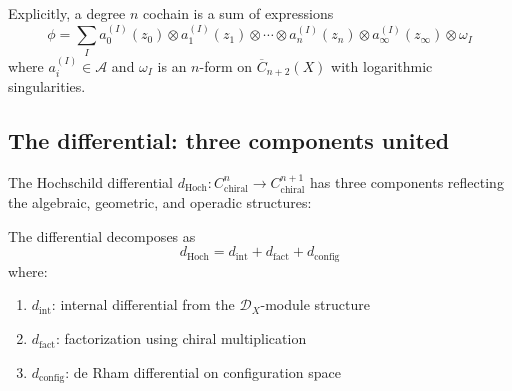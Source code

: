 Explicitly, a degree $n$ cochain is a sum of expressions
\[
\phi = \sum_I a_0^{(I)}(z_0) \otimes a_1^{(I)}(z_1) \otimes \cdots \otimes a_n^{(I)}(z_n) \otimes a_{\infty}^{(I)}(z_{\infty}) \otimes \omega_I
\]
where $a_i^{(I)} \in \mathcal{A}$ and $\omega_I$ is an $n$-form on $\overline{C}_{n+2}(X)$ with logarithmic singularities.

\subsection{The differential: three components united}

The Hochschild differential
$d_{\mathrm{Hoch}}: C^n_{\text{chiral}} \to C^{n+1}_{\text{chiral}}$
has three components reflecting the algebraic, geometric, and operadic
structures:

\begin{theorem}
\label{thm:chiral-hochschild-differential}
The differential decomposes as
\[
d_{\mathrm{Hoch}} = d_{\text{int}} + d_{\text{fact}} + d_{\text{config}}
\]
where:
\begin{enumerate}
\item $d_{\text{int}}$: internal differential from the $\mathcal{D}_X$-module structure
\item $d_{\text{fact}}$: factorization using chiral multiplication  
\item $d_{\text{config}}$: de Rham differential on configuration space
\end{enumerate}
\end{theorem}

